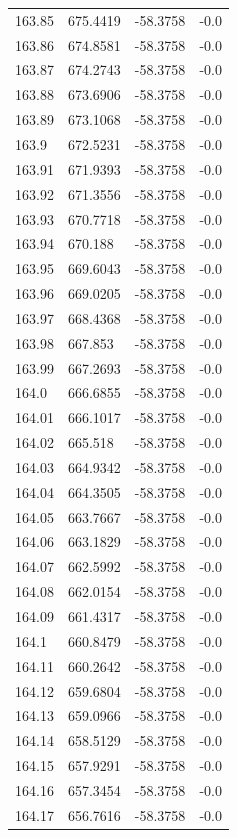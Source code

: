 \begin{table}[H]
\begin{tabular}{llll}
163.85 & 675.4419 & -58.3758 & -0.0 \\
163.86 & 674.8581 & -58.3758 & -0.0 \\
163.87 & 674.2743 & -58.3758 & -0.0 \\
163.88 & 673.6906 & -58.3758 & -0.0 \\
163.89 & 673.1068 & -58.3758 & -0.0 \\
163.9 & 672.5231 & -58.3758 & -0.0 \\
163.91 & 671.9393 & -58.3758 & -0.0 \\
163.92 & 671.3556 & -58.3758 & -0.0 \\
163.93 & 670.7718 & -58.3758 & -0.0 \\
163.94 & 670.188 & -58.3758 & -0.0 \\
163.95 & 669.6043 & -58.3758 & -0.0 \\
163.96 & 669.0205 & -58.3758 & -0.0 \\
163.97 & 668.4368 & -58.3758 & -0.0 \\
163.98 & 667.853 & -58.3758 & -0.0 \\
163.99 & 667.2693 & -58.3758 & -0.0 \\
164.0 & 666.6855 & -58.3758 & -0.0 \\
164.01 & 666.1017 & -58.3758 & -0.0 \\
164.02 & 665.518 & -58.3758 & -0.0 \\
164.03 & 664.9342 & -58.3758 & -0.0 \\
164.04 & 664.3505 & -58.3758 & -0.0 \\
164.05 & 663.7667 & -58.3758 & -0.0 \\
164.06 & 663.1829 & -58.3758 & -0.0 \\
164.07 & 662.5992 & -58.3758 & -0.0 \\
164.08 & 662.0154 & -58.3758 & -0.0 \\
164.09 & 661.4317 & -58.3758 & -0.0 \\
164.1 & 660.8479 & -58.3758 & -0.0 \\
164.11 & 660.2642 & -58.3758 & -0.0 \\
164.12 & 659.6804 & -58.3758 & -0.0 \\
164.13 & 659.0966 & -58.3758 & -0.0 \\
164.14 & 658.5129 & -58.3758 & -0.0 \\
164.15 & 657.9291 & -58.3758 & -0.0 \\
164.16 & 657.3454 & -58.3758 & -0.0 \\
164.17 & 656.7616 & -58.3758 & -0.0 \\

\end{tabular}
\end{table}
